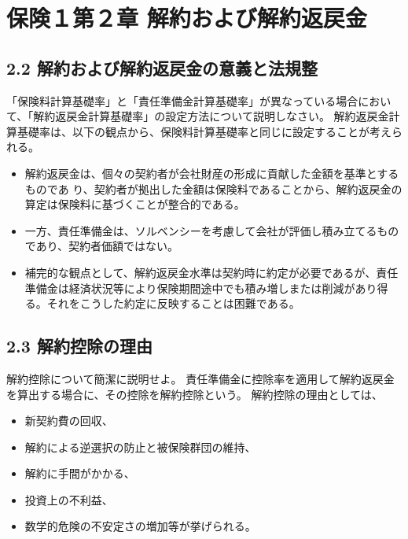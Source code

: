 \documentclass[report,gutter=10mm,fore-edge=10mm,uplatex,dvipdfmx]{jlreq}
\begin{document}
\chapter{保険１第２章 解約および解約返戻金}
\section{2.2 解約および解約返戻金の意義と法規整}
「保険料計算基礎率」と「責任準備金計算基礎率」が異なっている場合において、「解約返戻金計算基礎率」の設定方法について説明しなさい。
解約返戻金計算基礎率は、以下の観点から、保険料計算基礎率と同じに設定することが考えられる。  
\begin{itemize}
\item 解約返戻金は、個々の契約者が会社財産の形成に貢献した金額を基準とするものであ  り、契約者が拠出した金額は保険料であることから、解約返戻金の算定は保険料に基づくことが整合的である。
\item 一方、責任準備金は、ソルベンシーを考慮して会社が評価し積み立てるものであり、契約者価額ではない。
\item 補完的な観点として、解約返戻金水準は契約時に約定が必要であるが、責任準備金は経済状況等により保険期間途中でも積み増しまたは削減があり得る。それをこうした約定に反映することは困難である。
\end{itemize}

\section{2.3 解約控除の理由}

解約控除について簡潔に説明せよ。
責任準備金に控除率を適用して解約返戻金を算出する場合に、その控除を解約控除という。
解約控除の理由としては、
\begin{itemize}
\item 新契約費の回収、
\item 解約による逆選択の防止と被保険群団の維持、
\item 解約に手間がかかる、
\item 投資上の不利益、
\item 数学的危険の不安定さの増加等が挙げられる。
\end{itemize}
\end{document}
